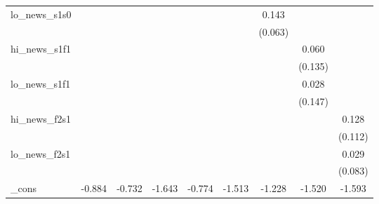 {\begin{tabular}{l*{8}{c}}
\addlinespace
lo\_news\_s1s0&                     &                     &                     &                     &                     &       0.143\sym{**} &                     &                     \\
            &                     &                     &                     &                     &                     &     (0.063)         &                     &                     \\
\addlinespace
hi\_news\_s1f1&                     &                     &                     &                     &                     &                     &       0.060         &                     \\
            &                     &                     &                     &                     &                     &                     &     (0.135)         &                     \\
\addlinespace
lo\_news\_s1f1&                     &                     &                     &                     &                     &                     &       0.028         &                     \\
            &                     &                     &                     &                     &                     &                     &     (0.147)         &                     \\
\addlinespace
hi\_news\_f2s1&                     &                     &                     &                     &                     &                     &                     &       0.128         \\
            &                     &                     &                     &                     &                     &                     &                     &     (0.112)         \\
\addlinespace
lo\_news\_f2s1&                     &                     &                     &                     &                     &                     &                     &       0.029         \\
            &                     &                     &                     &                     &                     &                     &                     &     (0.083)         \\
\addlinespace
\_cons      &      -0.884\sym{**} &      -0.732\sym{*}  &      -1.643\sym{***}&      -0.774         &      -1.513\sym{***}&      -1.228\sym{***}&      -1.520\sym{***}&      -1.593\sym{***}\\

\end{tabular}}
